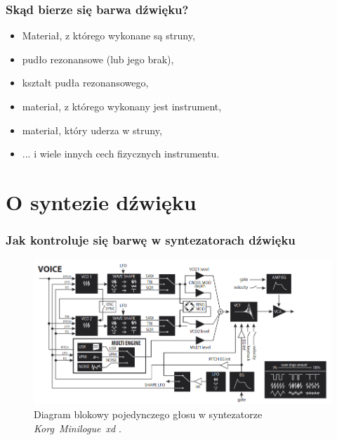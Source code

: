 \documentclass[]{beamer}
\begin{document}
\begin{frame}
  \frametitle{Skąd bierze się barwa dźwięku?}
  \begin{itemize}
    \item Materiał, z którego wykonane są struny,
    \item pudło rezonansowe (lub jego brak),
    \item kształt pudła rezonansowego,
    \item materiał, z którego wykonany jest instrument,
    \item materiał, który uderza w struny,
    \item ... i wiele innych cech fizycznych instrumentu.
  \end{itemize}
\end{frame}

\section{O syntezie dźwięku}
\begin{frame}
  \frametitle{Jak kontroluje się barwę w syntezatorach dźwięku}

  \begin{figure}
    \centering
    \includegraphics[width=0.9\linewidth]{minilogue_voice_block_diagram.png}

    \caption{
      Diagram blokowy pojedynczego głosu w syntezatorze 
      \textit{Korg~Minilogue~xd} \cite{minilogue_diagram}.
    }
  \end{figure}
\end{frame}
\end{document}
